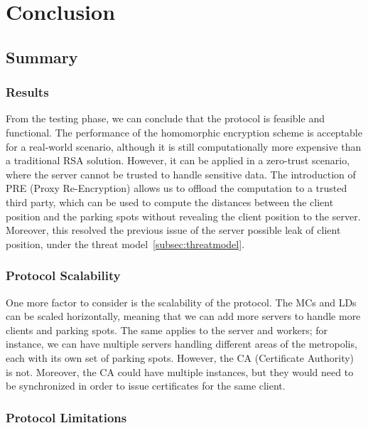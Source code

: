 \chapter{Conclusion}

\section{Summary}

\subsection{Results}

From the testing phase, we can conclude that the protocol is feasible and functional. The performance of the homomorphic encryption scheme is acceptable for a real-world scenario, although it is still computationally more expensive than a traditional RSA solution. However, it can be applied in a zero-trust scenario, where the server cannot be trusted to handle sensitive data. The introduction of PRE (Proxy Re-Encryption) allows us to offload the computation to a trusted third party, which can be used to compute the distances between the client position and the parking spots without revealing the client position to the server. Moreover, this resolved the previous issue of the server possible leak of client position, under the threat model~\cref{subsec:threatmodel}.

\subsection{Protocol Scalability}

One more factor to consider is the scalability of the protocol. The MCs and LDs can be scaled horizontally, meaning that we can add more servers to handle more clients and parking spots. The same applies to the server and workers; for instance, we can have multiple servers handling different areas of the metropolis, each with its own set of parking spots. However, the CA (Certificate Authority) is not. Moreover, the CA could have multiple instances, but they would need to be synchronized in order to issue certificates for the same client.

\subsection{Protocol Limitations}

